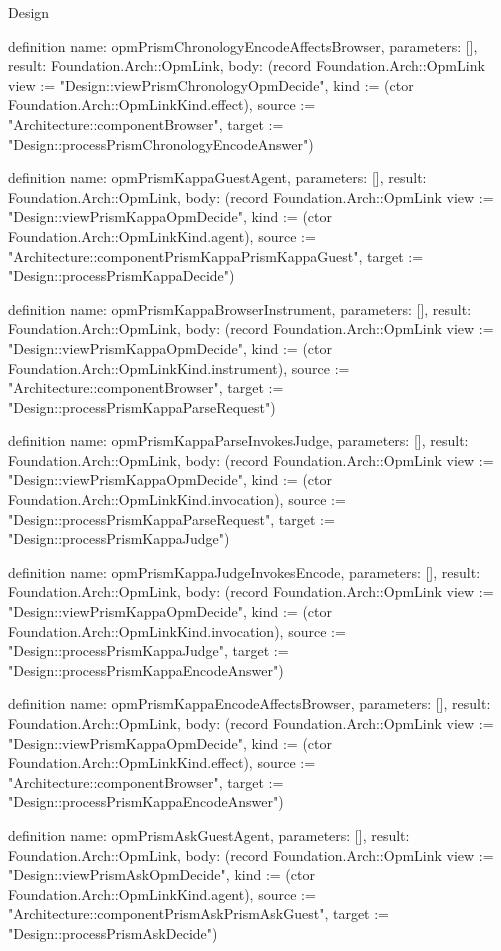 \begin{lexlean}{Design}
\begin{semanticmodule}
definition{
  name: opmPrismChronologyEncodeAffectsBrowser,
  parameters: [],
  result: Foundation.Arch::OpmLink,
  body: (record Foundation.Arch::OpmLink {view := "Design::viewPrismChronologyOpmDecide", kind := (ctor Foundation.Arch::OpmLinkKind.effect), source := "Architecture::componentBrowser", target := "Design::processPrismChronologyEncodeAnswer"})
}

definition{
  name: opmPrismKappaGuestAgent,
  parameters: [],
  result: Foundation.Arch::OpmLink,
  body: (record Foundation.Arch::OpmLink {view := "Design::viewPrismKappaOpmDecide", kind := (ctor Foundation.Arch::OpmLinkKind.agent), source := "Architecture::componentPrismKappaPrismKappaGuest", target := "Design::processPrismKappaDecide"})
}

definition{
  name: opmPrismKappaBrowserInstrument,
  parameters: [],
  result: Foundation.Arch::OpmLink,
  body: (record Foundation.Arch::OpmLink {view := "Design::viewPrismKappaOpmDecide", kind := (ctor Foundation.Arch::OpmLinkKind.instrument), source := "Architecture::componentBrowser", target := "Design::processPrismKappaParseRequest"})
}

definition{
  name: opmPrismKappaParseInvokesJudge,
  parameters: [],
  result: Foundation.Arch::OpmLink,
  body: (record Foundation.Arch::OpmLink {view := "Design::viewPrismKappaOpmDecide", kind := (ctor Foundation.Arch::OpmLinkKind.invocation), source := "Design::processPrismKappaParseRequest", target := "Design::processPrismKappaJudge"})
}

definition{
  name: opmPrismKappaJudgeInvokesEncode,
  parameters: [],
  result: Foundation.Arch::OpmLink,
  body: (record Foundation.Arch::OpmLink {view := "Design::viewPrismKappaOpmDecide", kind := (ctor Foundation.Arch::OpmLinkKind.invocation), source := "Design::processPrismKappaJudge", target := "Design::processPrismKappaEncodeAnswer"})
}

definition{
  name: opmPrismKappaEncodeAffectsBrowser,
  parameters: [],
  result: Foundation.Arch::OpmLink,
  body: (record Foundation.Arch::OpmLink {view := "Design::viewPrismKappaOpmDecide", kind := (ctor Foundation.Arch::OpmLinkKind.effect), source := "Architecture::componentBrowser", target := "Design::processPrismKappaEncodeAnswer"})
}

definition{
  name: opmPrismAskGuestAgent,
  parameters: [],
  result: Foundation.Arch::OpmLink,
  body: (record Foundation.Arch::OpmLink {view := "Design::viewPrismAskOpmDecide", kind := (ctor Foundation.Arch::OpmLinkKind.agent), source := "Architecture::componentPrismAskPrismAskGuest", target := "Design::processPrismAskDecide"})
}


\end{semanticmodule}
\end{lexlean}
